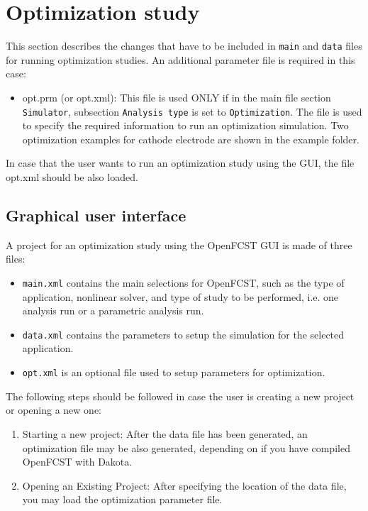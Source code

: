 \section{Optimization study}

This section describes the changes that have to be included in \texttt{main} and \texttt{data} files for running optimization studies. An additional parameter file is required in this case:

\begin{itemize}
 \item opt.prm (or opt.xml): This file is used ONLY if in the main file section \texttt{Simulator}, subsection \texttt{Analysis type} is set to \texttt{Optimization}. The file is used to specify the required information to run an optimization simulation. Two optimization examples for cathode electrode are shown in the example folder.
\end{itemize}

In case that the user wants to run an optimization study using the GUI, the file opt.xml should be also loaded.


\subsection{Graphical user interface}
A project for an optimization study using the OpenFCST GUI is made of three files:

\begin{itemize}
 \item \texttt{main.xml} contains the main selections for OpenFCST, such as the type of application, nonlinear solver, and type of study to be performed, i.e. one analysis run or a parametric analysis run.
 \item \texttt{data.xml} contains the parameters to setup the simulation for the selected application.
 \item \texttt{opt.xml} is an optional file used to setup parameters for optimization.
\end{itemize}

The following steps should be followed in case the user is creating a new project or opening a new one:

\begin{enumerate}
 \item Starting a new project: After the data file has been generated, an optimization file may be also generated, depending on if you have compiled OpenFCST with Dakota.
 \item Opening an Existing Project: After specifying the location of the data file, you may load the optimization parameter file. 
\end{enumerate}

